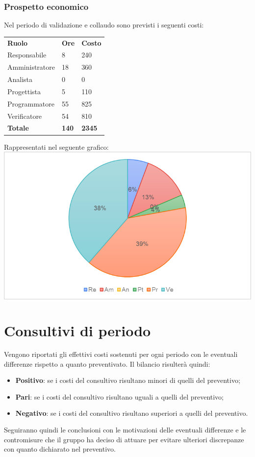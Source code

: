 \subsubsection{Prospetto economico}
Nel periodo di validazione e collaudo sono previsti i seguenti costi:
\begin{longtable} {
		>{}p{32mm}
		>{}p{20mm}
		>{}p{20mm}
	}
	\rowcolor{gray!50}
	
	\textbf{Ruolo} & \textbf{Ore} & \textbf{Costo} \TBstrut \\
	Responsabile & 8 & 240 \TBstrut \\
	Amministratore & 18 & 360 \TBstrut \\
	Analista & 0 & 0 \TBstrut \\
	Progettista & 5 & 110 \TBstrut \\
	Programmatore & 55 & 825 \TBstrut \\
	Verificatore & 54 & 810 \TBstrut \\
	\textbf{Totale} & \textbf{140}& \textbf{2345} \TBstrut \\		
\end{longtable}
Rappresentati nel seguente grafico: \\
\includegraphics[width=\linewidth]{./img/Grafici/8.png}
	
\section{Consultivi di periodo}
Vengono riportati gli effettivi costi sostenuti per ogni periodo con le eventuali differenze rispetto a quanto preventivato. Il bilancio risulterà quindi:
\begin{itemize}
	\item \textbf{Positivo}: se i costi del consultivo risultano minori di quelli del preventivo;
	\item \textbf{Pari}: se i costi del consultivo risultano uguali a quelli del preventivo;
	\item \textbf{Negativo}: se i costi del consultivo risultano superiori a quelli del preventivo.
\end{itemize}
Seguiranno quindi le conclusioni con le motivazioni delle eventuali differenze e le contromisure che il gruppo ha deciso di attuare per evitare ulteriori discrepanze con quanto dichiarato nel preventivo.

